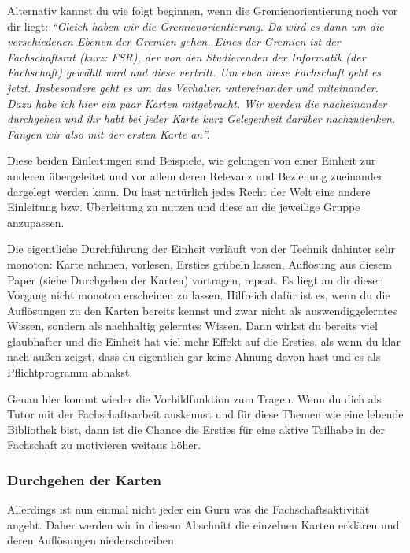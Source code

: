 \documentclass[a4paper,11pt]{scrartcl} %
\begin{document}
Alternativ kannst du wie folgt beginnen, wenn die Gremienorientierung noch vor dir liegt: \textit{"`Gleich haben wir die Gremienorientierung. Da wird es dann um die verschiedenen Ebenen der Gremien gehen. Eines der Gremien ist der Fachschaftsrat (kurz: FSR), der von den Studierenden der Informatik (der Fachschaft) gewählt wird und diese vertritt. Um eben diese Fachschaft geht es jetzt.
Insbesondere geht es um das Verhalten untereinander und miteinander. Dazu habe ich hier ein paar Karten mitgebracht. Wir werden die nacheinander durchgehen und ihr habt bei jeder Karte kurz Gelegenheit darüber nachzudenken. Fangen wir also mit der ersten Karte an"'.}

Diese beiden Einleitungen sind Beispiele, wie gelungen von einer Einheit zur anderen übergeleitet und vor allem deren Relevanz und Beziehung zueinander dargelegt werden kann. Du hast natürlich jedes Recht der Welt eine andere Einleitung bzw. Überleitung zu nutzen und diese an die jeweilige Gruppe anzupassen.

Die eigentliche Durchführung der Einheit verläuft von der Technik dahinter sehr monoton: Karte nehmen, vorlesen, Ersties grübeln lassen, Auflösung aus diesem Paper (siehe Durchgehen der Karten) vortragen, repeat.
Es liegt an dir diesen Vorgang nicht monoton erscheinen zu lassen. Hilfreich dafür ist es, wenn du die Auflösungen zu den Karten bereits kennst und zwar nicht als auswendiggelerntes Wissen, sondern als nachhaltig gelerntes Wissen. Dann wirkst du bereits viel glaubhafter und die Einheit hat viel mehr Effekt auf die Ersties, als wenn du klar nach außen zeigst, dass du eigentlich gar keine Ahnung davon hast und es als Pflichtprogramm abhakst.

Genau hier kommt wieder die Vorbildfunktion zum Tragen. Wenn du dich als Tutor mit der Fachschaftsarbeit auskennst und für diese Themen wie eine lebende Bibliothek bist, dann ist die Chance die Ersties für eine aktive Teilhabe in der Fachschaft zu motivieren weitaus höher.

	\subsubsection{Durchgehen der Karten}
	
	Allerdings ist nun einmal nicht jeder ein Guru was die Fachschaftsaktivität angeht. Daher werden wir in diesem Abschnitt die einzelnen Karten erklären und deren Auflösungen niederschreiben.
	
\end{document}
